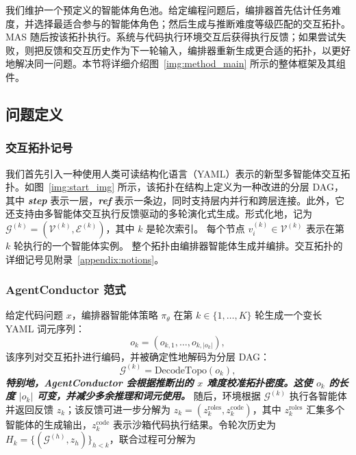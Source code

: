\documentclass{article}
\theoremstyle{definition}
\begin{document}
我们维护一个预定义的智能体角色池。给定编程问题后，编排器首先估计任务难度，并选择最适合参与的智能体角色；然后生成与推断难度等级匹配的交互拓扑。MAS 随后按该拓扑执行。系统与代码执行环境交互后获得执行反馈；如果尝试失败，则把反馈和交互历史作为下一轮输入，编排器重新生成更合适的拓扑，以更好地解决同一问题。本节将详细介绍图~\ref{img:method_main} 所示的整体框架及其组件。

\subsection{问题定义}

\subsubsection{交互拓扑记号}
我们首先引入一种使用人类可读结构化语言（YAML）表示的新型多智能体交互拓扑。如图~\ref{img:start_img} 所示，该拓扑在结构上定义为一种改进的分层 DAG，其中 \textbf{\textit{step}} 表示一层，\textbf{\textit{ref}} 表示一条边，同时支持层内并行和跨层连接。此外，它还支持由多智能体交互执行反馈驱动的多轮演化式生成。形式化地，记为 $\mathcal{G}^{(k)} = (\mathcal{V}^{(k)}, \mathcal{E}^{(k)})$，其中 $k$ 是轮次索引。
每个节点 $v_{i}^{(k)} \in \mathcal{V}^{(k)}$ 表示在第 $k$ 轮执行的一个智能体实例。
整个拓扑由编排器智能体生成并编排。交互拓扑的详细记号见附录~\ref{appendix:notions}。

\subsubsection{AgentConductor 范式}
给定代码问题 $x$，编排器智能体策略 $\pi_\theta$ 在第 $k\in\{1,\dots,K\}$ 轮生成一个变长 YAML 词元序列：\begin{equation}\label{eq:topo_seq}
o_k=(o_{k,1},\ldots,o_{k,|o_k|}), 
\end{equation} 该序列对交互拓扑进行编码，并被确定性地解码为分层 DAG：\begin{equation}
\mathcal{G}^{(k)} = \mathrm{DecodeTopo}(o_k),
\label{eq:decode-topo}
\end{equation} 
\textbf{\textit{特别地，AgentConductor 会根据推断出的 $x$ 难度校准拓扑密度。这使 $o_k$ 的长度 $|o_k|$ 可变，并减少多余推理和词元使用。}}
随后，环境根据 $\mathcal{G}^{(k)}$ 执行各智能体并返回反馈 $z_k$；该反馈可进一步分解为 $z_k=(z_k^{\text{roles}}, z_k^{\text{code}})$，其中 $z_k^{\text{roles}}$ 汇集多个智能体的生成输出，$z_k^{\text{code}}$ 表示沙箱代码执行结果。令轮次历史为 $H_k=\{(\mathcal{G}^{(h)},z_h)\}_{h<k}$，联合过程可分解为
\end{document}
